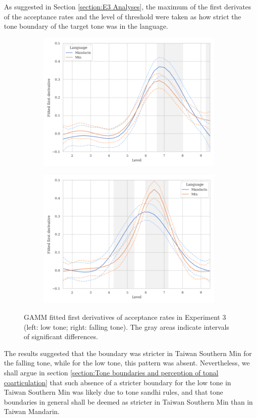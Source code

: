 As suggested in Section \ref{section:E3 Analyses}, the maximum of the first derivates of the acceptance rates and the level of threshold were taken as how strict the tone boundary of the target tone was in the language.
\begin{figure}[hbt!]
\centering
\begin{subfigure}[b]{.45\textwidth}
\centering
\includegraphics[width=\textwidth]{figures/E3/Tone21_speed_GAMM.png}
\end{subfigure}
\hfill
\begin{subfigure}[b]{.45\textwidth}
\centering
\includegraphics[width=\textwidth]{figures/E3/Tone51_speed_GAMM.png}
\end{subfigure}
\caption{GAMM fitted first derivatives of acceptance rates in Experiment 3 (left: low tone; right: falling tone). The gray areas indicate intervals of significant differences.}
\label{Figure:E3GAMM}
\end{figure}
The results suggested that the boundary was stricter in Taiwan Southern Min for the falling tone, while for the low tone, this pattern was absent. Nevertheless, we shall argue in section \ref{section:Tone boundaries and perception of tonal coarticulation} that such absence of a stricter boundary for the low tone in Taiwan Southern Min was likely due to tone sandhi rules, and that tone boundaries in general shall be deemed as stricter in Taiwan Southern Min than in Taiwan Mandarin.

